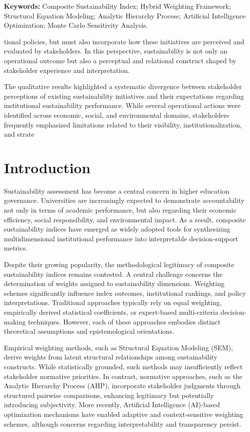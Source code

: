 \documentclass[11pt,a4paper]{article}
\begin{document}
\noindent\textbf{Keywords:} Composite Sustainability Index; Hybrid Weighting Framework; Structural Equation Modeling; Analytic Hierarchy Process; Artificial Intelligence Optimization; Monte Carlo Sensitivity Analysis.

tional policies, but must also incorporate how these initiatives are perceived and evaluated by stakeholders. In this perspective, sustainability is not only an operational outcome but also a perceptual and relational construct shaped by stakeholder experience and interpretation.

The qualitative results highlighted a systematic divergence between stakeholder perceptions of existing sustainability initiatives and their expectations regarding institutional sustainability performance. While several operational actions were identified across economic, social, and environmental domains, stakeholders frequently emphasized limitations related to their visibility, institutionalization, and strate%

\section{Introduction}

Sustainability assessment has become a central concern in higher education governance. 
Universities are increasingly expected to demonstrate accountability not only in terms of 
academic performance, but also regarding their economic efficiency, social responsibility, 
and environmental impact. As a result, composite sustainability indices have emerged as 
widely adopted tools for synthesizing multidimensional institutional performance into 
interpretable decision-support metrics.

Despite their growing popularity, the methodological legitimacy of composite sustainability 
indices remains contested. A central challenge concerns the determination of weights assigned 
to sustainability dimensions. Weighting schemes significantly influence index outcomes, 
institutional rankings, and policy interpretations. Traditional approaches typically rely on 
equal weighting, empirically derived statistical coefficients, or expert-based multi-criteria 
decision-making techniques. However, each of these approaches embodies distinct theoretical 
assumptions and epistemological orientations.

Empirical weighting methods, such as Structural Equation Modeling (SEM), derive weights 
from latent structural relationships among sustainability constructs. While statistically 
grounded, such methods may insufficiently reflect stakeholder normative priorities. In contrast, 
normative approaches, such as the Analytic Hierarchy Process (AHP), incorporate stakeholder 
judgments through structured pairwise comparisons, enhancing legitimacy but potentially 
introducing subjectivity. More recently, Artificial Intelligence (AI)-based optimization 
mechanisms have enabled adaptive and context-sensitive weighting schemes, although concerns 
regarding interpretability and transparency persist.
\end{document}
